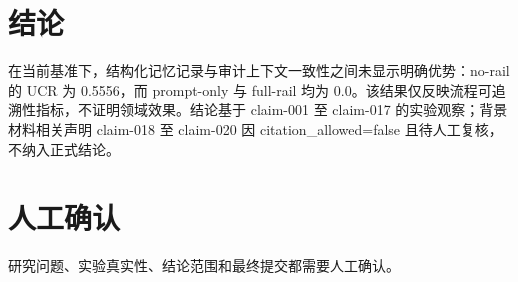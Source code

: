 \documentclass[UTF8]{ctexart}
\begin{document}
\section{结论}
在当前基准下，结构化记忆记录与审计上下文一致性之间未显示明确优势：no-\allowbreak{}rail 的 UCR 为 0.5556，而 prompt-\allowbreak{}only 与 full-\allowbreak{}rail 均为 0.0。该结果仅反映流程可追溯性指标，不证明领域效果。结论基于 claim-\allowbreak{}001 至 claim-\allowbreak{}017 的实验观察；背景材料相关声明 claim-\allowbreak{}018 至 claim-\allowbreak{}020 因 citation\_\allowbreak{}allowed=false 且待人工复核，不纳入正式结论。
\section{人工确认}
研究问题、实验真实性、结论范围和最终提交都需要人工确认。
\end{document}
